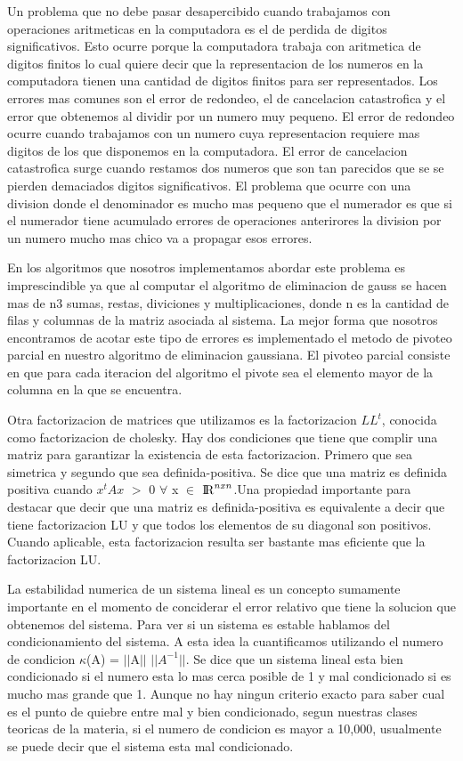 \indent Un problema que no debe pasar desapercibido cuando trabajamos con operaciones aritmeticas en la computadora es el de perdida de digitos significativos. Esto ocurre porque la computadora trabaja con aritmetica de digitos finitos lo cual quiere decir que la representacion de los numeros en la computadora tienen una cantidad de digitos finitos para ser representados. Los errores mas comunes son el error de redondeo, el de cancelacion catastrofica y el error que obtenemos al dividir por un numero muy pequeno. El error de redondeo ocurre cuando trabajamos con un numero cuya representacion requiere mas digitos de los que disponemos en la computadora. El error de cancelacion catastrofica surge cuando restamos dos numeros que son tan parecidos que se se pierden demaciados digitos significativos. El problema que ocurre con una division donde el denominador es mucho mas pequeno que el numerador es que si el numerador tiene acumulado errores de operaciones anterirores la division por un numero mucho mas chico va a propagar esos errores.\par
\indent En los algoritmos que nosotros implementamos abordar este problema es imprescindible ya que al computar el algoritmo de eliminacion de gauss se hacen mas de n3 sumas, restas, diviciones y multiplicaciones, donde n es la cantidad de filas y columnas de la matriz asociada al sistema. La mejor forma que nosotros encontramos de acotar este tipo de errores es implementado el metodo de pivoteo parcial en nuestro algoritmo de eliminacion gaussiana. El pivoteo parcial consiste en que para cada iteracion del algoritmo el pivote sea el elemento mayor de la columna en la que se encuentra.\par
\indent Otra factorizacion de matrices que utilizamos es la factorizacion $LL^{t}$, conocida como factorizacion de cholesky. Hay dos condiciones que tiene que complir una matriz para garantizar la existencia de esta factorizacion. Primero que sea simetrica y segundo que sea definida-positiva. Se dice que una matriz es definida positiva cuando $x^{t}Ax$ $>$ 0 $\forall$ x $\in$ ${\rm I\!R}^{nxn}$.Una propiedad importante para destacar que decir que una matriz es definida-positiva es equivalente a decir que tiene factorizacion LU y que todos los elementos de su diagonal son positivos. Cuando aplicable, esta factorizacion resulta ser bastante mas eficiente que la factorizacion LU.\par
\indent La estabilidad numerica de un sistema lineal es un concepto sumamente importante en el momento de conciderar  el error relativo que tiene la solucion que obtenemos del sistema. Para ver si un sistema es estable hablamos del condicionamiento del sistema. A esta idea la cuantificamos utilizando el numero de condicion $\kappa$(A) = $||$A$||$ $||A^{-1}||$. Se dice que un sistema lineal esta bien condicionado si el numero esta lo mas cerca posible de 1 y mal condicionado si es mucho mas grande que 1. Aunque no hay ningun criterio exacto para saber cual es el punto de quiebre entre mal y bien condicionado, segun nuestras clases teoricas de la materia, si el numero de condicion es mayor a 10,000, usualmente se puede decir que el sistema esta mal condicionado.\par